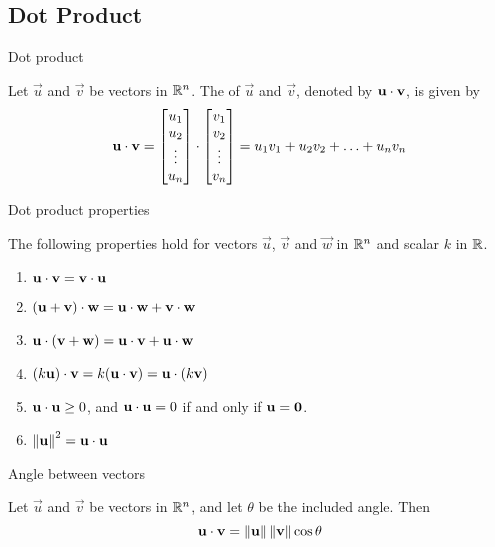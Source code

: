 \documentclass{ximera}
\begin{document}
\subsection{Dot Product}
Dot product 
\begin{expandable}
  Let $\vec{u}$ and $\vec{v}$ be vectors in $\RR^n$.  The  of $\vec{u}$ and $\vec{v}$, denoted by
  $\vec{u}\dotp \vec{v}$, is given by
$$\vec{u}\dotp\vec{v}=\begin{bmatrix}u_1\\u_2\\\vdots\\u_n\end{bmatrix}\dotp\begin{bmatrix}v_1\\v_2\\\vdots\\v_n\end{bmatrix}=u_1v_1+u_2v_2+\ldots+u_nv_n$$
\end{expandable}

Dot product properties
\begin{expandable}
    The following properties hold for
  vectors $\vec{u}$, $\vec{v}$ and $\vec{w}$ in $\RR^n$ and scalar
  $k$ in $\RR$.
  \begin{enumerate}
  \item
    $\vec{u}\dotp\vec{v}=\vec{v}\dotp\vec{u}$
  \item $(\vec{u}+\vec{v})\dotp \vec{w}=\vec{u}\dotp \vec{w}+\vec{v}\dotp \vec{w}$
  \item $\vec{u}\dotp (\vec{v}+\vec{w})=\vec{u}\dotp\vec{v}+\vec{u}\dotp \vec{w}$
  \item $(k\vec{u})\dotp \vec{v}=k(\vec{u}\dotp\vec{v})=\vec{u}\dotp (k\vec{v})$
  \item  $\vec{u}\dotp\vec{u}\geq 0$, and $\vec{u}\dotp\vec{u}=0$ if and only if $\vec{u}={\bf 0}$.
  \item 
    $\norm{\vec{u}}^2=\vec{u}\dotp\vec{u}$
  \end{enumerate}
\end{expandable}

Angle between vectors
\begin{expandable}
     Let $\vec{u}$ and $\vec{v}$ be vectors in $\RR^n$, and let $\theta$ be the included angle.  Then
  $$\vec{u}\dotp\vec{v}=\norm{\vec{u}}\norm{\vec{v}}\cos \theta$$
\end{expandable}
\end{document}
